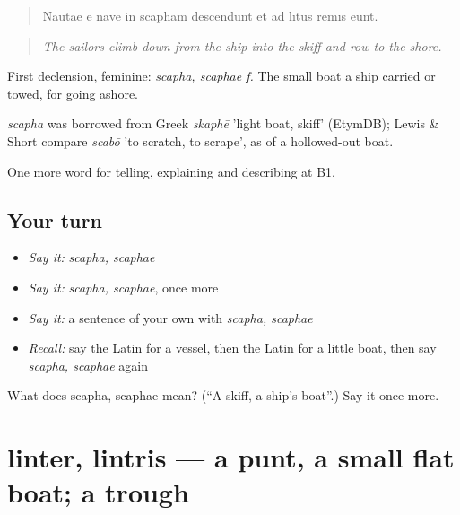 \begin{quote}
Nautae ē nāve in scapham dēscendunt et ad lītus remīs eunt.
\end{quote}

\begin{quote}
\emph{The sailors climb down from the ship into the skiff and row to the shore.}
\end{quote}

First declension, feminine: \emph{scapha, scaphae f.} The small boat a ship carried or towed, for going ashore.

\begin{cousinweb}
\emph{scapha} was borrowed from Greek \emph{skaphē} 'light boat, skiff' (EtymDB); Lewis \& Short compare \emph{scabō} 'to scratch, to scrape', as of a hollowed-out boat.
\end{cousinweb}

\begin{grammarlens}[title={What you've built}]
One more word for telling, explaining and describing at B1.
\end{grammarlens}

\subsection*{Your turn}
\begin{itemize}
\raggedright
  \item \emph{Say it:} \emph{scapha, scaphae}
  \item \emph{Say it:} \emph{scapha, scaphae}, once more
  \item \emph{Say it:} a sentence of your own with \emph{scapha, scaphae}
  \item \emph{Recall:} say the Latin for a vessel, then the Latin for a little boat, then say \emph{scapha, scaphae} again
\end{itemize}

\begin{tcolorbox}[breakable,colback=teal!4,colframe=teal!35!black,title={Before you move on}]
What does scapha, scaphae mean? (\textquotedblleft{}A skiff, a ship's boat\textquotedblright{}.) Say it once more.
\end{tcolorbox}
\section[linter, lintris]{linter, lintris — a punt, a small flat boat; a trough}

\label{lesson:LA-C435-linter}



